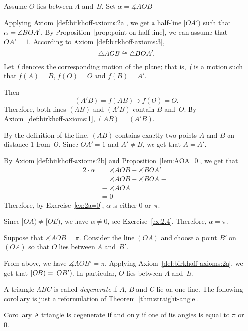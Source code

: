 Assume $O$  
lies between $A$ and~$B$.
Set  $\alpha=\measuredangle A O B$.

Applying Axiom~\ref{def:birkhoff-axioms:2a},
we get a half-line $[OA')$ such that $\alpha\z=\measuredangle B O A'$.
By Proposition~\ref{prop:point-on-half-line}, we can assume that $OA'=1$.
According to Axiom~\ref{def:birkhoff-axioms:3},
\[\triangle AOB\z\cong\triangle BOA'.\]
Let $f$ denotes the corresponding motion of the plane;
that is, $f$ is a motion such that $f(A)=B$, $f(O)=O$ and $f(B)=A'$. 

Then 
\[(A'B)=f(AB)\ni f(O)=O.\]
Therefore, both lines $(AB)$ and $(A'B)$ contain $B$ and~$O$.
By Axiom~\ref{def:birkhoff-axioms:1}, $(AB)=(A'B)$.

By the definition of the line,
$(AB)$ contains exactly two points $A$ and $B$ on distance $1$ from~$O$.
Since $OA'=1$ and $A'\ne B$, we get that $A=A'$.

By Axiom \ref{def:birkhoff-axioms:2b} and Proposition~\ref{lem:AOA=0}, we get that
\begin{align*}
2\cdot\alpha&=
\measuredangle AOB+\measuredangle BOA'=
\\
&=\measuredangle AOB+\measuredangle BOA\equiv
\\
&\equiv\measuredangle AOA=
\\
&= 0
\end{align*}
Therefore, by Exercise~\ref{ex:2a=0}, $\alpha$ is either $0$ or~$\pi$.

Since $[OA)\ne [OB)$,  
we have $\alpha\ne 0$, see Exercise~\ref{ex:2.4}.
Therefore, $\alpha=\pi$.


Suppose that $\measuredangle A O B= \pi$.
Consider the line $(OA)$ and choose a point $B'$ on $(OA)$ so that $O$ lies between $A$ and~$B'$.

From above, we have $\measuredangle AOB'=\pi$.
Applying Axiom~\ref{def:birkhoff-axioms:2a}, 
we get that $[O B)\z=[O B')$.
In particular, $O$ lies between $A$ and~$B$.
\qeds 

A triangle $ABC$ is called 
\emph{degenerate}
if $A$, $B$ and $C$ lie on one line.
The following corollary is just a reformulation of Theorem~\ref{thm:straight-angle}.

\begin{thm}[\abs]{Corollary}\label{cor:degenerate=pi}
A triangle is degenerate if and only if one of its angles is equal to $\pi$ or~$0$.
\end{thm}

